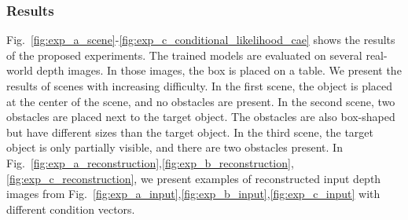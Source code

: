 \documentclass[letterpaper, 10 pt, journal, twoside]{ieeetran}  %
\begin{document}
\subsubsection*{Results}
Fig.~\ref{fig:exp_a_scene}-\ref{fig:exp_c_conditional_likelihood_cae} shows the results of the proposed experiments.
The trained models are evaluated on several real-world depth images. In those images, the box is placed on a table. We present the results of scenes with increasing difficulty. In the first scene, the object is placed at the center of the scene, and no obstacles are present. In the second scene, two obstacles are placed next to the target object. The obstacles are also box-shaped but have different sizes than the target object. In the third scene, the target object is only partially visible, and there are two obstacles present.
In Fig.~\ref{fig:exp_a_reconstruction},\ref{fig:exp_b_reconstruction},\ref{fig:exp_c_reconstruction}, we present examples of reconstructed input depth images from Fig.~\ref{fig:exp_a_input},\ref{fig:exp_b_input},\ref{fig:exp_c_input} with different condition vectors.
\end{document}
